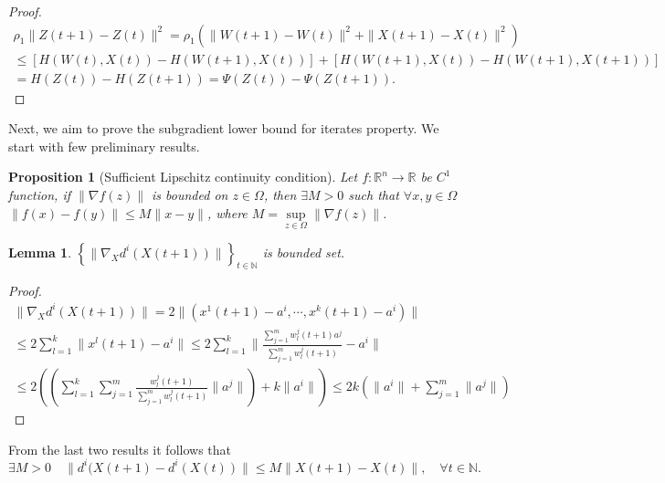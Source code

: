 \documentclass[11pt]{article}
\numberwithin{equation}{section}
\newtheorem{proposition}{Proposition}[section]
\newtheorem{lemma}{Lemma}[proposition]
\begin{document}
\begin{proof}
\begin{equation*}
	\begin{split}
	\rho_1 \|Z(t+1) - Z(t)\|^2 
	= \rho_1 \left( \|W(t+1) - W(t)\|^2 + \|X(t+1) - X(t)\|^2 \right) \\
	\leq \left[ H(W(t),X(t)) - H(W(t+1),X(t)) \right] + \left[ H(W(t+1),X(t)) - H(W(t+1),X(t+1)) \right] \\
	= H(Z(t)) - H(Z(t+1)) = \Psi(Z(t)) - \Psi(Z(t+1)).
	\end{split}
\end{equation*}
\end{proof}

Next, we aim to prove the subgradient lower bound for iterates property. We start with few preliminary results.

\begin{proposition}[Sufficient Lipschitz continuity condition]
Let $f:\mathbb{R}^n \to \mathbb{R}$ be $C^1$ function, if $\|\nabla f(z)\|$ is bounded on $z \in \Omega$, then $\exists M > 0$ such that $\forall x,y \in \Omega$ $\|f(x) - f(y)\| \leq M \|x - y\|$, where $M = \sup\limits_{z \in \Omega} \| \nabla f(z)\|$.
\end{proposition}

\begin{lemma}
$\left\lbrace \| \nabla_X d^i(X(t+1))\| \right\rbrace_{t \in \mathbb{N}}$ is bounded set.
\end{lemma}

\begin{proof}
\begin{equation*}
	\begin{split}
	\| \nabla_X d^i(X(t+1))\| = 2\| \left( x^1(t+1)-a^i, \cdots , x^k(t+1)-a^i \right)\| \\
	\leq 2\sum\limits_{l=1}^{k} \|x^l(t+1)-a^i\|
	\leq 2\sum\limits_{l=1}^{k} \| \frac{\sum\limits_{j=1}^{m} w^j_l(t+1) a^j}{\sum\limits_{j=1}^{m} w^j_l(t+1)} - a^i \| \\
	\leq 2\left(\left( \sum\limits_{l=1}^{k} \sum\limits_{j=1}^{m} \frac{w^j_l(t+1)}{\sum\limits_{j=1}^{m} w^j_l(t+1)} \|a^j\| \right) + k\|a^i\| \right) 
	\leq 2k \left(\|a^i\| + \sum\limits_{j=1}^{m} \|a^j\| \right)
	\end{split}
\end{equation*}
\end{proof}

From the last two results it follows that
\begin{equation}
\exists M > 0 \quad \| d^i(X(t+1) - d^i(X(t))\| \leq M \| X(t+1) - X(t) \| , \quad \forall t \in \mathbb{N}. \label{StateEq11}
\end{equation}
\end{document}
